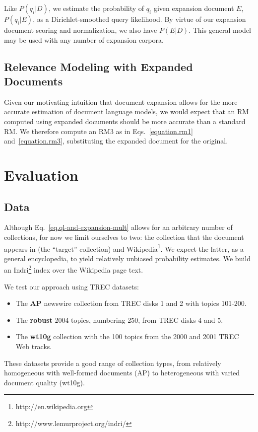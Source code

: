 \documentclass[sigconf]{acmart}
\begin{document}
\noindent Like $P(q_i|D)$, we estimate the probability of $q_i$ given expansion document $E$, $P(q_i|E)$, as a Dirichlet-smoothed query likelihood. By virtue of our expansion document scoring and normalization, we also have $P(E|D)$. This general model may be used with any number of expansion corpora.

\subsection{Relevance Modeling with Expanded Documents}

Given our motivating intuition that document expansion allows for the more accurate estimation of document language models, we would expect that an RM computed using expanded documents should be more accurate than a standard RM. We therefore compute an RM3 as in Eqs.~\ref{equation.rm1} and~\ref{equation.rm3}, substituting the expanded document for the original.

\section{Evaluation}\label{section.evaluation}

\subsection{Data}\label{section.evaluation.collections}

Although Eq.~\ref{eq.ql-and-expansion-mult} allows for an arbitrary number of collections, for now we limit ourselves to two: the collection that the document appears in (the ``target'' collection) and Wikipedia\footnote{http://en.wikipedia.org}. We expect the latter, as a general encyclopedia, to yield relatively unbiased probability estimates. We build an Indri\footnote{http://www.lemurproject.org/indri/} index over the Wikipedia page text.

We test our approach using TREC datasets:
\begin{itemize}
	\item The \textbf{AP} newswire collection from TREC disks 1 and 2 with topics 101-200.
	\item The \textbf{robust} 2004 topics, numbering 250, from TREC disks 4 and 5.
	\item The \textbf{wt10g} collection with the 100 topics from the 2000 and 2001 TREC Web tracks.
\end{itemize}

These datasets provide a good range of collection types, from relatively homogeneous with well-formed documents (AP) to heterogeneous with varied document quality (wt10g).
\end{document}

